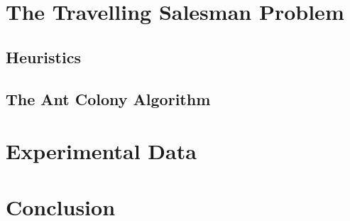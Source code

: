 \documentclass{article}
\begin{document}
\section{The Travelling Salesman Problem}
\subsection{Heuristics}
\subsection{The Ant Colony Algorithm}
\newpage
\section{Experimental Data}
\newpage
\section{Conclusion}
\newpage


\end{document}
